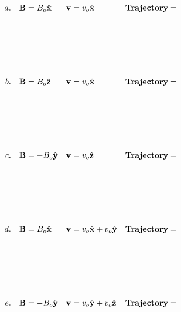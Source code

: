 \documentclass{article}
\begin{document}
\begin{equation}
\begin{align*}
a.\quad & \mathbf{B} =  B_o\hat{\mathbf{x}}&  \mathbf{v} &= v_o\hat{\mathbf{x}} & & \bf{Trajectory =} \\\\\\\\ \\\\
b.\quad & \mathbf{B} =  B_o\hat{\mathbf{z}} &  \mathbf{v} & = v_o\hat{\mathbf{x}}& &  \bf{Trajectory =} \\\\\\\\ \\\\
c.\quad  & \mathbf{B} = -B_o\hat{\mathbf{y}} & \mathbf{v} & = v_o\hat{\mathbf{z}}& & \bf{Trajectory =} \\\\\\\\ \\\\
d.\quad  & \mathbf{B} = B_o\hat{\mathbf{x}} & \mathbf{v} & = v_o\hat{\mathbf{x}}+v_o\hat{\mathbf{y}}& &\bf{Trajectory =}\\\\\\\\ \\\\
e.\quad  & \mathbf{B} = -B_o\hat{\mathbf{y}} & \mathbf{v} & = v_o\hat{\mathbf{y}}+v_o\hat{\mathbf{z}}& & \bf{Trajectory =} & 
\end{align*}
\end{equation}
\fi
\end{document}
